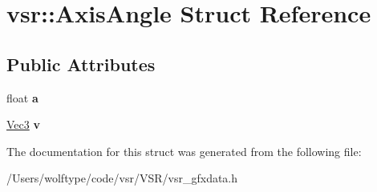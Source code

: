 \hypertarget{structvsr_1_1_axis_angle}{\section{vsr\-:\-:Axis\-Angle Struct Reference}
\label{structvsr_1_1_axis_angle}
}
\subsection*{Public Attributes}
\begin{DoxyCompactItemize}
\item 
\hypertarget{structvsr_1_1_axis_angle_a90d710d857e9ed882fe34a540e286fb3}{float {\bfseries a}}\label{structvsr_1_1_axis_angle_a90d710d857e9ed882fe34a540e286fb3}

\item 
\hypertarget{structvsr_1_1_axis_angle_abe2f5c1ef24733ad240db0df219c384d}{\hyperlink{classvsr_1_1_vec3}{Vec3} {\bfseries v}}\label{structvsr_1_1_axis_angle_abe2f5c1ef24733ad240db0df219c384d}

\end{DoxyCompactItemize}


The documentation for this struct was generated from the following file\-:\begin{DoxyCompactItemize}
\item 
/\-Users/wolftype/code/vsr/\-V\-S\-R/vsr\-\_\-gfxdata.\-h\end{DoxyCompactItemize}
